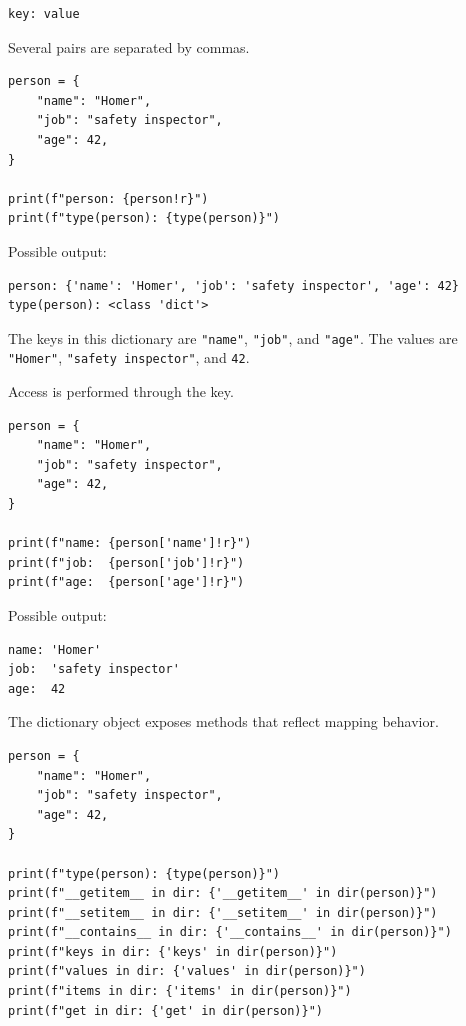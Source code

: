 \begin{verbatim}
key: value
\end{verbatim}

Several pairs are separated by commas.

\begin{verbatim}
person = {
    "name": "Homer",
    "job": "safety inspector",
    "age": 42,
}

print(f"person: {person!r}")
print(f"type(person): {type(person)}")
\end{verbatim}

Possible output:

\begin{verbatim}
person: {'name': 'Homer', 'job': 'safety inspector', 'age': 42}
type(person): <class 'dict'>
\end{verbatim}

The keys in this dictionary are \texttt{"name"}, \texttt{"job"}, and \texttt{"age"}. The values are \texttt{"Homer"}, \texttt{"safety inspector"}, and \texttt{42}.

Access is performed through the key.

\begin{verbatim}
person = {
    "name": "Homer",
    "job": "safety inspector",
    "age": 42,
}

print(f"name: {person['name']!r}")
print(f"job:  {person['job']!r}")
print(f"age:  {person['age']!r}")
\end{verbatim}

Possible output:

\begin{verbatim}
name: 'Homer'
job:  'safety inspector'
age:  42
\end{verbatim}

The dictionary object exposes methods that reflect mapping behavior.

\begin{verbatim}
person = {
    "name": "Homer",
    "job": "safety inspector",
    "age": 42,
}

print(f"type(person): {type(person)}")
print(f"__getitem__ in dir: {'__getitem__' in dir(person)}")
print(f"__setitem__ in dir: {'__setitem__' in dir(person)}")
print(f"__contains__ in dir: {'__contains__' in dir(person)}")
print(f"keys in dir: {'keys' in dir(person)}")
print(f"values in dir: {'values' in dir(person)}")
print(f"items in dir: {'items' in dir(person)}")
print(f"get in dir: {'get' in dir(person)}")
\end{verbatim}

